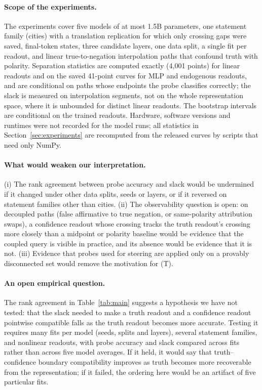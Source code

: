 \documentclass[10pt]{article}
\theoremstyle{definition}
\theoremstyle{remark}
\begin{document}
\paragraph{Scope of the experiments.}
The experiments cover five models of at most 1.5B parameters, one
statement family (cities) with a translation replication for which only
crossing gaps were saved, final-token states, three candidate layers, one
data split, a single fit per readout, and linear true-to-negation
interpolation paths that confound truth with polarity. Separation
statistics are computed exactly (4{,}001 points) for linear readouts and on
the saved 41-point curves for MLP and endogenous readouts, and are
conditional on paths whose endpoints the probe classifies correctly; the
slack is measured on interpolation segments, not on the whole
representation space, where it is unbounded for distinct linear
readouts. The bootstrap intervals
are conditional on the trained readouts. Hardware, software versions and
runtimes were not recorded for the model runs; all statistics in
Section~\ref{sec:experiments} are recomputed from the released curves by
scripts that need only NumPy.

\paragraph{What would weaken our interpretation.}
(i) The rank agreement between probe accuracy and slack would be
undermined if it changed under other data splits, seeds or layers, or if
it reversed on statement families other than cities. (ii) The
observability question is open: on decoupled paths (false affirmative to
true negation, or same-polarity attribution swaps), a confidence readout
whose crossing tracks the truth readout's crossing more closely than a
midpoint or polarity baseline would be evidence that the coupled query is
visible in practice, and its absence would be evidence that it is not. (iii)
Evidence that probes used for steering are applied only on a provably
disconnected set would remove the motivation for (T).

\paragraph{An open empirical question.}
The rank agreement in Table~\ref{tab:main} suggests a hypothesis we have
not tested: that the slack needed to make a truth readout and a
confidence readout pointwise compatible falls as the truth readout
becomes more accurate. Testing it requires many fits per model (seeds,
splits and layers), several statement families, and nonlinear readouts,
with probe accuracy and slack compared across fits rather than across
five model averages. If it held, it would say that truth--confidence
boundary compatibility improves as truth becomes more recoverable from
the representation; if it failed, the ordering here would be an artifact
of five particular fits.
\end{document}
